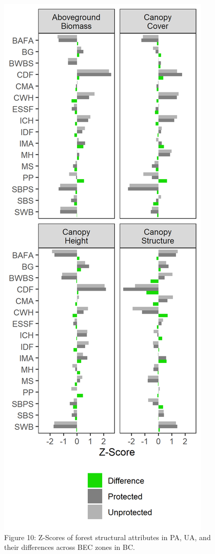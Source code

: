 \documentclass[10pt,oneside]{article}
\makeatletter
\def\maxwidth{\ifdim\Gin@nat@width>\linewidth\linewidth
\else\Gin@nat@width\fi}
\let\Oldincludegraphics\includegraphics
\renewcommand{\includegraphics}[1]{\Oldincludegraphics[width=\maxwidth]{#1}}
\makeatother
\begin{document}
\begin{figure}
\hypertarget{fig:structure-3d-scatter}{%
\centering
\includegraphics{figures/fstruct_zscores.png}
\caption{Figure 10: Z-Scores of forest structural attributes in PA, UA,
and their differences across BEC zones in
BC.}\label{fig:structure-3d-scatter}
}
\end{figure}
\end{document}
